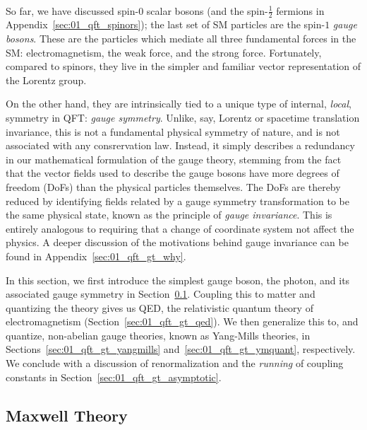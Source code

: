 \

So far, we have discussed spin-$0$ scalar bosons (and the spin-$\frac{1}{2}$ fermions in Appendix~\ref{sec:01_qft_spinors}); the last set of SM particles are the spin-$1$ \textit{gauge bosons}.
These are the particles which mediate all three fundamental forces in the SM: electromagnetism, the weak force, and the strong force.
Fortunately, compared to spinors, they live in the simpler and familiar vector representation of the Lorentz group.

On the other hand, they are intrinsically tied to a unique type of internal, \textit{local}, symmetry in QFT: \textit{gauge symmetry}.
Unlike, say, Lorentz or spacetime translation invariance, this is not a fundamental physical symmetry of nature, and is not associated with any consrervation law.
Instead, it simply describes a redundancy in our mathematical formulation of the gauge theory, stemming from the fact that the vector fields used to describe the gauge bosons have more degrees of freedom (DoFs) than the physical particles themselves.
The DoFs are thereby reduced by identifying fields related by a gauge symmetry transformation to be the same physical state, known as the principle of \textit{gauge invariance}.
This is entirely analogous to requiring that a change of coordinate system not affect the physics.
A deeper discussion of the motivations behind gauge invariance can be found in Appendix~\ref{sec:01_qft_gt_why}.

In this section, we first introduce the simplest gauge boson, the photon, and its associated \UU[1] gauge symmetry in Section~\ref{sec:01_qft_gt_maxwell}.
Coupling this to matter and quantizing the theory gives us QED, the relativistic quantum theory of electromagnetism (Section~\ref{sec:01_qft_gt_qed}).
We then generalize this to, and quantize, non-abelian gauge theories, known as Yang-Mills theories, in Sections~\ref{sec:01_qft_gt_yangmills} and~\ref{sec:01_qft_gt_ymquant}, respectively.
We conclude with a discussion of renormalization and the \textit{running} of coupling constants in Section~\ref{sec:01_qft_gt_asymptotic}.


\subsection{Maxwell Theory}
\label{sec:01_qft_gt_maxwell}

